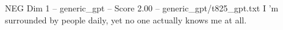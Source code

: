 \begin{textsample}{NEG Dim 1 – generic\_gpt – Score 2.00 – generic\_gpt/t825\_gpt.txt}  \label{ex:f1_neg_032}
I ’m surrounded by people daily, yet no one actually knows me at all.

\end{textsample}
